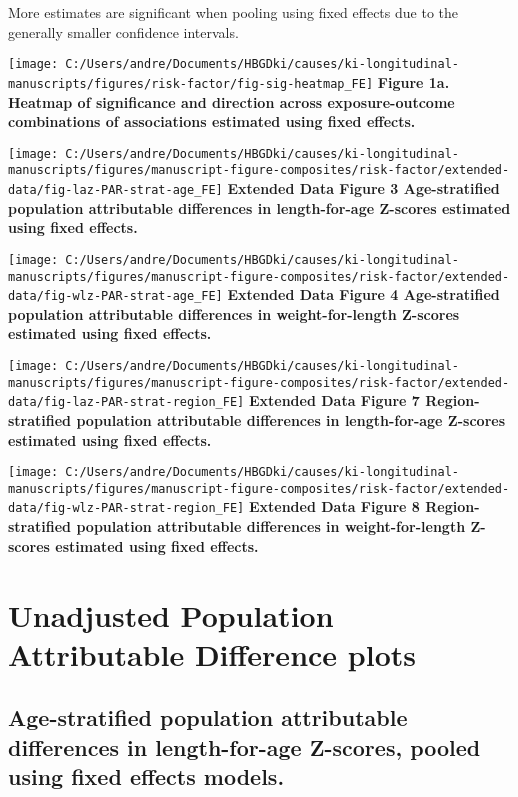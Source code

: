 \documentclass[
  9pt,
]{book}
\begin{document}
More estimates are significant when pooling using fixed effects due to the generally smaller confidence intervals.

\texttt{[image: C:/Users/andre/Documents/HBGDki/causes/ki-longitudinal-manuscripts/figures/risk-factor/fig-sig-heatmap\_FE]}
\textbf{Figure 1a. Heatmap of significance and direction across exposure-outcome combinations of associations estimated using fixed effects. }

\texttt{[image: C:/Users/andre/Documents/HBGDki/causes/ki-longitudinal-manuscripts/figures/manuscript-figure-composites/risk-factor/extended-data/fig-laz-PAR-strat-age\_FE]}
\textbf{Extended Data Figure 3 \textbar{} Age-stratified population attributable differences in length-for-age Z-scores estimated using fixed effects. }

\texttt{[image: C:/Users/andre/Documents/HBGDki/causes/ki-longitudinal-manuscripts/figures/manuscript-figure-composites/risk-factor/extended-data/fig-wlz-PAR-strat-age\_FE]}
\textbf{Extended Data Figure 4 \textbar{} Age-stratified population attributable differences in weight-for-length Z-scores estimated using fixed effects. }

\texttt{[image: C:/Users/andre/Documents/HBGDki/causes/ki-longitudinal-manuscripts/figures/manuscript-figure-composites/risk-factor/extended-data/fig-laz-PAR-strat-region\_FE]}
\textbf{Extended Data Figure 7 \textbar{} Region-stratified population attributable differences in length-for-age Z-scores estimated using fixed effects. }

\texttt{[image: C:/Users/andre/Documents/HBGDki/causes/ki-longitudinal-manuscripts/figures/manuscript-figure-composites/risk-factor/extended-data/fig-wlz-PAR-strat-region\_FE]}
\textbf{Extended Data Figure 8 \textbar{} Region-stratified population attributable differences in weight-for-length Z-scores estimated using fixed effects. }

\hypertarget{unadjusted}{%
\chapter{Unadjusted Population Attributable Difference plots}\label{unadjusted}}

\raggedright

\hypertarget{age-stratified-population-attributable-differences-in-length-for-age-z-scores-pooled-using-fixed-effects-models.}{%
\section{Age-stratified population attributable differences in length-for-age Z-scores, pooled using fixed effects models.}\label{age-stratified-population-attributable-differences-in-length-for-age-z-scores-pooled-using-fixed-effects-models.}}
\end{document}
